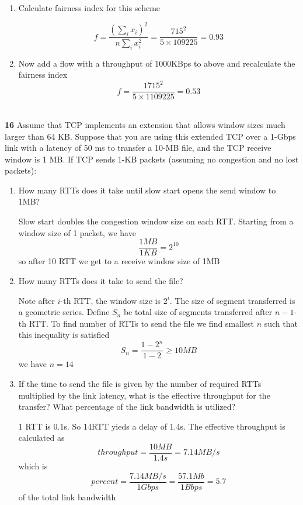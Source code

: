 \documentclass[11pt]{article}
\begin{document}
\begin{enumerate}
    \item Calculate fairness index for this scheme
    \begin{solution}
        \[
            f = \frac{(\sum_i x_i)^2}{n \sum_i x_i^2} = \frac{715^2}{5 \times 109225} = 0.93
        \]
    \end{solution}
    \item Now add a flow with a throughput of 1000KBps to above and recalculate the fairness index 
    \[
        f = \frac{1715^2}{5\times 1109225} = 0.53
    \]
\end{enumerate}    




$ $\\
\textbf{16} Assume that TCP implements an extension that allows window sizes much larger than 64 KB. Suppose that you are using this extended TCP over a 1-Gbps link with a latency of 50 ms to transfer a 10-MB file, and the TCP receive window is 1 MB. If TCP sends 1-KB packets (assuming no congestion and no lost packets):
\begin{enumerate}
    \item How many RTTs does it take until slow start opens the send window to 1MB? 
    \begin{solution}
        Slow start doubles the congestion window size on each RTT. Starting from a window size of 1 packet, we have
        \[
            \frac{1MB}{1KB} = 2^{10}
        \]
        so after 10 RTT we get to a receive window size of 1MB
    \end{solution}
    \item How many RTTs does it take to send the file?
    \begin{solution}
        Note after $i$-th RTT, the window size is $2^i$. The size of segment transferred is a geometric series. Define $S_n$ be total size of segments transferred after $n-1$-th RTT. To find number of RTTs to send the file we find smallest $n$ such that this inequality is satisfied
        \[
            S_n = \frac{1-2^{n}}{1-2} \geq 10MB
        \]
        we have $n=14$ 
    \end{solution}
    \item If the time to send the file is given by the number of required RTTs multiplied by the link latency, what is the effective throughput for the transfer? What percentage of the link bandwidth is utilized?    
    \begin{solution}
        1 RTT is 0.1s. So 14RTT yieds a delay of 1.4s. The effective throughput is calculated as 
        \[
            throughput = \frac{10MB}{1.4s} = 7.14 MB/s
        \]
        which is 
        \[
            percent = \frac{7.14MB/s}{1Gbps} = \frac{57.1Mb}{1Bbps} = 5.7%
        \]
        of the total link bandwidth
    \end{solution}
\end{enumerate}
\end{document}

